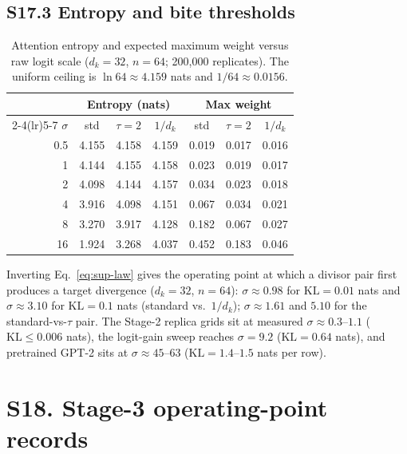 \documentclass[10pt,a4paper]{article}
\newcommand{\dk}{d_k}
\begin{document}
\subsection*{S17.3 Entropy and bite thresholds}
\begin{table}[H]
  \centering
  \caption{Attention entropy and expected maximum weight versus raw logit
  scale ($d_k = 32$, $n = 64$; 200{,}000 replicates). The uniform ceiling is
  $\ln 64 \approx 4.159$ nats and $1/64 \approx 0.0156$.}
  \label{tab:s17-entropy}
  \small
  \begin{tabular*}{0.9\textwidth}{@{\extracolsep{\fill}} r ccc ccc}
    \toprule
    & \multicolumn{3}{c}{\textbf{Entropy (nats)}} &
      \multicolumn{3}{c}{\textbf{Max weight}} \\
    \cmidrule(lr){2-4}\cmidrule(lr){5-7}
    $\sigma$ & std & $\tau{=}2$ & $1/\dk$ & std & $\tau{=}2$ & $1/\dk$ \\
    \midrule
    0.5 & 4.155 & 4.158 & 4.159 & 0.019 & 0.017 & 0.016 \\
    1   & 4.144 & 4.155 & 4.158 & 0.023 & 0.019 & 0.017 \\
    2   & 4.098 & 4.144 & 4.157 & 0.034 & 0.023 & 0.018 \\
    4   & 3.916 & 4.098 & 4.151 & 0.067 & 0.034 & 0.021 \\
    8   & 3.270 & 3.917 & 4.128 & 0.182 & 0.067 & 0.027 \\
    16  & 1.924 & 3.268 & 4.037 & 0.452 & 0.183 & 0.046 \\
    \bottomrule
  \end{tabular*}
\end{table}

Inverting Eq.~\eqref{eq:sup-law} gives the operating point at which a divisor
pair first produces a target divergence ($d_k = 32$, $n = 64$):
$\sigma \approx 0.98$ for $\mathrm{KL} = 0.01$ nats and $\sigma \approx 3.10$
for $\mathrm{KL} = 0.1$ nats (standard vs.\ $1/\dk$); $\sigma \approx 1.61$
and $5.10$ for the standard-vs-$\tau$ pair. The Stage-2 replica grids sit at
measured $\sigma \approx 0.3$--$1.1$ ($\mathrm{KL} \le 0.006$ nats), the
logit-gain sweep reaches $\sigma = 9.2$ ($\mathrm{KL} = 0.64$ nats), and
pretrained GPT-2 sits at $\sigma \approx 45$--$63$
($\mathrm{KL} = 1.4$--$1.5$ nats per row).

\section*{S18. Stage-3 operating-point records}\label{sup:stage3}
\end{document}
